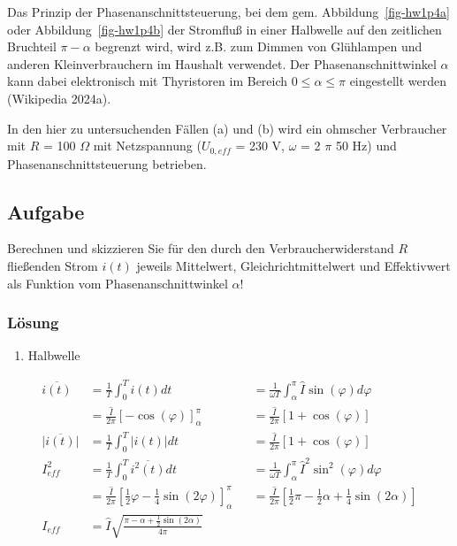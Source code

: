 \documentclass[
  ngerman,
  letterpaper,
]{scrbook}
\providecommand{\tightlist}{%
  \setlength{\itemsep}{0pt}\setlength{\parskip}{0pt}}
\begin{document}
Das Prinzip der Phasenanschnittsteuerung, bei dem gem.
Abbildung~\ref{fig-hw1p4a} oder Abbildung~\ref{fig-hw1p4b} der Stromfluß
in einer Halbwelle auf den zeitlichen Bruchteil \(\pi-\alpha\) begrenzt
wird, wird z.B. zum Dimmen von Glühlampen und anderen Kleinverbrauchern
im Haushalt verwendet. Der Phasenanschnittwinkel \(\alpha\) kann dabei
elektronisch mit Thyristoren im Bereich \(0 \leq
\alpha \leq \pi\) eingestellt werden (Wikipedia 2024a).

In den hier zu untersuchenden Fällen (a) und (b) wird ein ohmscher
Verbraucher mit \(R\) = 100 \(\Omega\) mit Netzspannung (\(U_{0,eff}\) =
230 V, \(\omega\) = 2 \(\pi\) 50 Hz) und Phasenanschnittsteuerung
betrieben.

\subsection{Aufgabe}\label{aufgabe}

Berechnen und skizzieren Sie für den durch den Verbraucherwiderstand
\(R\) fließenden Strom \(i(t)\) jeweils Mittelwert,
Gleichrichtmittelwert und Effektivwert als Funktion vom
Phasenanschnittwinkel \(\alpha\)!

\subsubsection{Lösung}\label{luxf6sung-7}

\begin{enumerate}
\def\labelenumi{\arabic{enumi}.}
\tightlist
\item
  Halbwelle
\end{enumerate}

\begin{align}
\overline{i(t)} &= \frac{1}{T} \int_0^{T} i(t) d t & &= \frac{1}{\omega T} \int_{\alpha}^{\pi}\hat{I}\sin(\varphi) d \varphi \\
&= \frac{\hat{I}}{2\pi} \left[ -\cos(\varphi) \right]_{\alpha}^{\pi} & &= \frac{\hat{I}}{2\pi} \left[ 1+\cos(\varphi) \right] \\
\overline{\lvert i(t) \lvert} &= \frac{1}{T} \int_0^{T} \lvert i(t) \lvert d t & &= \frac{\hat{I}}{2\pi} \left[ 1+\cos(\varphi) \right] \\
I^2_{eff} &= \frac{1}{T} \int_0^{T} \overline{i^2(t)} d t & &= \frac{1}{\omega T} \int_{\alpha}^{\pi}\hat{I}^2\sin^2(\varphi) d \varphi \\
&= \frac{\hat{I}}{2\pi} \left[ \frac{1}{2}\varphi - \frac{1}{4}\sin(2\varphi) \right]_{\alpha}^{\pi} &
&= \frac{\hat{I}}{2\pi} \left[ \frac{1}{2}\pi -\frac{1}{2}\alpha + \frac{1}{4}\sin(2\alpha) \right] \\
I_{eff} &= \hat{I} \sqrt{\frac{\pi-\alpha +\frac{1}{2}\sin(2\alpha)}{4\pi}} & &
\end{align}
\end{document}
